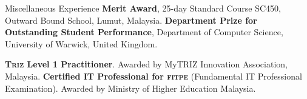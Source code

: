 \begin{rubric}{Miscellaneous Experience}
\entry*[2002] \textbf{Merit Award}, 25-day Standard Course SC450, Outward Bound School, Lumut, Malaysia.
%
\entry*[2001] \textbf{Department Prize for Outstanding Student Performance}, Department of Computer Science, University of Warwick, United Kingdom.

\entry*[2014] \textbf{\textsc{Triz} Level 1 Practitioner}. Awarded by MyTRIZ Innovation Association, Malaysia.
\entry*[2006] \textbf{Certified IT Professional for \textsc{fitpe}} (Fundamental IT Professional Examination).  Awarded by Ministry of Higher Education Malaysia.

\end{rubric}